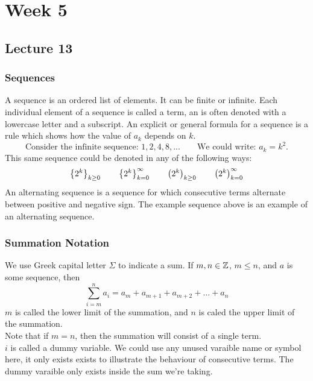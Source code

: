 \documentclass{report}
\begin{document}
\chapter{Week 5}
\section{Lecture 13}
\subsection*{Sequences}
A sequence is an ordered list of elements. It can be finite or infinite. Each individual element of a sequence is called a term, an is often denoted with a lowercase letter and a subscript. An explicit or general formula for a sequence is a rule which shows how the value of $a_k$ depends on $k$.
$$
	\text{Consider the infinite sequence: } 1, 2, 4, 8, ...\qquad \text{We could write: } a_k = k^2.
$$
This same sequence could be denoted in any of the following ways:
$$
	\left\lbrace 2^k \right\rbrace_{k\geq0}\qquad \left\lbrace 2^k \right\rbrace_{k=0}^{\infty}\qquad \left( 2^k \right)_{k\geq0}\qquad \left( 2^k \right)_{k=0}^{\infty}
$$
An alternating sequence is a sequence for which consecutive terms alternate between positive and negative sign. The example sequence above is an example of an alternating sequence.

\subsection*{Summation Notation}
We use Greek capital letter $\Sigma$ to indicate a sum. If $m,n\in\mathbb{Z}$, $m\leq n$, and $a$ is some sequence, then
$$
	\sum_{i=m}^{n} a_i = a_m + a_{m+1} + a_{m+2} + \dots + a_n
$$
$m$ is called the lower limit of the summation, and $n$ is caled the upper limit of the summation. \\
Note that if $m=n$, then the summation will consist of a single term. \\
$i$ is called a dummy variable. We could use any unused varaible name or symbol here, it only exists exists to illustrate the behaviour of consecutive terms. The dummy varaible only exists inside the sum we're taking.
\end{document}
